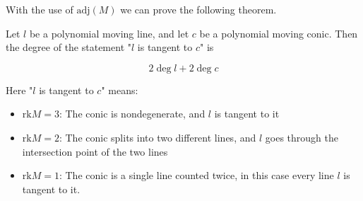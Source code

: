 \documentclass[a4paper]{article}
\begin{document}
With the use of $\mathrm{adj}(M)$ we can prove the following theorem.
\begin{theorem}
    Let $l$ be a polynomial moving line, and let $c$ be a polynomial moving conic. Then the degree of the statement "$l$ is tangent to $c$" is

    $$2\deg l+ 2\deg c$$
\end{theorem}
\begin{remark}

    Here "$l$ is tangent to $c$" means:
\begin{itemize}
    \item $\mathrm{rk}M=3$: The conic is nondegenerate, and $l$ is tangent to it
    \item $\mathrm{rk}M=2$: The conic splits into two different lines, and $l$ goes through the intersection point of the two lines
    \item $\mathrm{rk}M=1$: The conic is a single line counted twice, in this case every line $l$ is tangent to it.
\end{itemize}
\end{remark}
\end{document}
